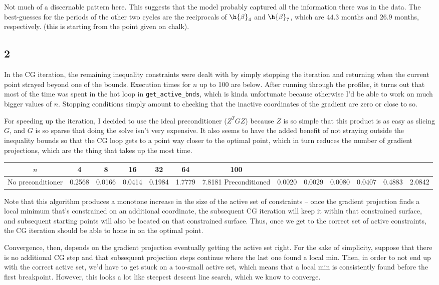 \documentclass{article}
\begin{document}
Not much of a discernable pattern here. This suggests that the model probably captured all the information there was in the data. The best-guesses for the periods of the other two cycles are the reciprocals of $\h{\beta}_4$ and $\h{\beta}_7$, which are $44.3$ months and $26.9$ months, respectively. (this is starting from the point given on chalk).
\subsection*{2}
In the CG iteration, the remaining inequality constraints were dealt with by simply stopping the iteration and returning when the current point strayed beyond one of the bounds. Execution times for $n$ up to 100 are below. After running through the profiler, it turns out that most of the time was spent in the hot loop in \verb|get_active_bnds|, which is kinda unfortunate because otherwise I'd be able to work on much bigger values of $n$. Stopping conditions simply amount to checking that the inactive coordinates of the gradient are zero or close to so.

For speeding up the iteration, I decided to use the ideal preconditioner ($Z^TGZ$) because $Z$ is so simple that this product is as easy as slicing $G$, and $G$ is so sparse that doing the solve isn't very expensive. It also seems to have the added benefit of not straying outside the inequality bounds so that the CG loop gets to a point way closer to the optimal point, which in turn reduces the number of gradient projections, which are the thing that takes up the most time.

\begin{tabular}{c|cccccc}
    $n$&4&8&16&32&64&100\\
    \hline
    No preconditioner&0.2568&0.0166&0.0414&0.1984&1.7779&7.8181
    \hline
    Preconditioned&0.0020&0.0029&0.0080&0.0407&0.4883&2.0842
\end{tabular}

Note that this algorithm produces a monotone increase in the size of the active set of constraints -- once the gradient projection finds a local minimum that's constrained on an additional coordinate, the subsequent CG iteration will keep it within that constrained surface, and subsequent starting points will also be located on that constrained surface. Thus, once we get to the correct set of active constraints, the CG iteration should be able to hone in on the optimal point. 

Convergence, then, depends on the gradient projection eventually getting the active set right. For the sake of simplicity, suppose that there is no additional CG step and that subsequent projection steps continue where the last one found a local min. Then, in order to not end up with the correct active set, we'd have to get stuck on a too-small active set, which means that a local min is consistently found before the first breakpoint. However, this looks a lot like steepest descent line search, which we know to converge.
\end{document}
